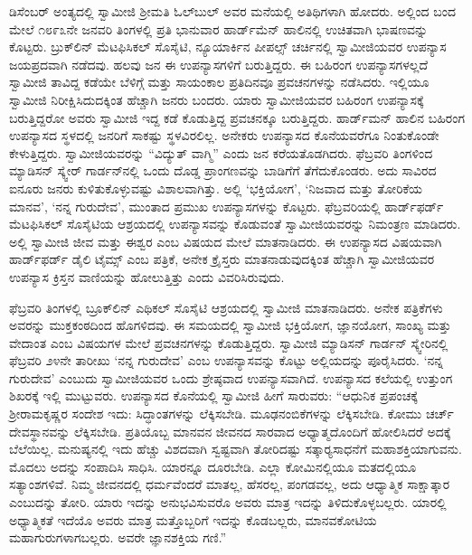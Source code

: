  ಡಿಸೆಂಬರ್ ಅಂತ್ಯದಲ್ಲಿ ಸ್ವಾಮೀಜಿ ಶ‍್ರೀಮತಿ ಓಲ್‍ಬುಲ್ ಅವರ ಮನೆಯಲ್ಲಿ ಅತಿಥಿಗಳಾಗಿ ಹೋದರು. ಅಲ್ಲಿಂದ ಬಂದ ಮೇಲೆ ೧೮೯೩ನೇ ಜನವರಿ ತಿಂಗಳಲ್ಲಿ ಪ್ರತಿ ಭಾನುವಾರ ಹಾರ್ಡ್‍ಮೆನ್ ಹಾಲಿನಲ್ಲಿ ಉಚಿತವಾಗಿ ಭಾಷಣವನ್ನು ಕೊಟ್ಟರು. ಬ್ರುಕ್‍ಲಿನ್ ಮೆಟಫಿಸಿಕಲ್ ಸೊಸೈಟಿ, ನ್ಯೂಯಾರ್ಕಿನ ಪೀಪಲ್ಸ್ ಚರ್ಚಿನಲ್ಲಿ ಸ್ವಾಮೀಜಿಯವರ ಉಪನ್ಯಾಸ ಜಯಪ್ರದವಾಗಿ ನಡೆದವು. ಹಲವು ಜನ ಈ ಉಪನ್ಯಾಸಗಳಿಗೆ ಬರುತ್ತಿದ್ದರು. ಈ ಬಹಿರಂಗ ಉಪನ್ಯಾಸಗಳಲ್ಲದೆ ಸ್ವಾಮೀಜಿ ತಾವಿದ್ದ ಕಡೆಯೇ ಬೆಳಿಗ್ಗೆ ಮತ್ತು ಸಾಯಂಕಾಲ ಪ್ರತಿದಿನವೂ ಪ್ರವಚನಗಳನ್ನು ನಡೆಸಿದರು. ಇಲ್ಲಿಯೂ ಸ್ವಾಮೀಜಿ ನಿರೀಕ್ಷಿಸಿದುದಕ್ಕಿಂತ ಹೆಚ್ಚಾಗಿ ಜನರು ಬಂದರು. ಯಾರು ಸ್ವಾಮೀಜಿಯವರ ಬಹಿರಂಗ ಉಪನ್ಯಾಸಕ್ಕೆ ಬರುತ್ತಿದ್ದರೋ ಅವರು ಸ್ವಾಮೀಜಿ ಇದ್ದ ಕಡೆ ಕೊಡುತ್ತಿದ್ದ ಪ್ರವಚನಕ್ಕೂ ಬರುತ್ತಿದ್ದರು. ಹಾರ್ಡ್‍ಮನ್ ಹಾಲಿನ ಬಹಿರಂಗ ಉಪನ್ಯಾಸದ ಸ್ಥಳದಲ್ಲಿ ಜನರಿಗೆ ಸಾಕಷ್ಟು ಸ್ಥಳವಿರಲಿಲ್ಲ. ಅನೇಕರು ಉಪನ್ಯಾಸದ ಕೊನೆಯವರೆಗೂ ನಿಂತುಕೊಂಡೇ ಕೇಳುತ್ತಿದ್ದರು. ಸ್ವಾಮೀಜಿಯವರನ್ನು “ವಿದ್ಯುತ್ ವಾಗ್ಮಿ” ಎಂದು ಜನ ಕರೆಯತೊಡಗಿದರು. ಫೆಬ್ರವರಿ ತಿಂಗಳಿಂದ ಮ್ಯಾಡಿಸನ್ ಸ್ಕ್ವೇರ್ ಗಾರ್ಡನ್‍ನಲ್ಲಿ ಒಂದು ದೊಡ್ಡ ಪ್ರಾಂಗಣವನ್ನು ಬಾಡಿಗೆಗೆ ತೆಗೆದುಕೊಂಡರು. ಅದು ಸಾವಿರದ ಐನೂರು ಜನರು ಕುಳಿತುಕೊಳ್ಳುವಷ್ಟು ವಿಶಾಲವಾಗಿತ್ತು. ಅಲ್ಲಿ ‘ಭಕ್ತಿಯೋಗ’, ‘ನಿಜವಾದ ಮತ್ತು ತೋರಿಕೆಯ ಮಾನವ’, ‘ನನ್ನ ಗುರುದೇವ’, ಮುಂತಾದ ಪ್ರಮುಖ ಉಪನ್ಯಾಸಗಳನ್ನು ಕೊಟ್ಟರು. ಫೆಬ್ರವರಿಯಲ್ಲಿ ಹಾರ್ಡ್‍ಫರ್ಡ್ ಮೆಟಫಿಸಿಕಲ್ ಸೊಸೈಟಿಯ ಆಶ್ರಯದಲ್ಲಿ ಉಪನ್ಯಾಸವನ್ನು ಕೊಡುವಂತೆ ಸ್ವಾಮೀಜಿಯವರನ್ನು ನಿಮಂತ್ರಣ ಮಾಡಿದರು. ಅಲ್ಲಿ ಸ್ವಾಮೀಜಿ ಜೀವ ಮತ್ತು ಈಶ್ವರ ಎಂಬ ವಿಷಯದ ಮೇಲೆ ಮಾತನಾಡಿದರು. ಈ ಉಪನ್ಯಾಸದ ವಿಷಯವಾಗಿ ಹಾರ್ಡ್‍ಫರ್ಡ್ ಡೈಲಿ ಟೈಮ್ಸ್ ಎಂಬ ಪತ್ರಿಕೆ, ಅನೇಕ ಕ್ರೈಸ್ತರು ಮಾತನಾಡುವುದಕ್ಕಿಂತ ಹೆಚ್ಚಾಗಿ ಸ್ವಾಮೀಜಿಯವರ ಉಪನ್ಯಾಸ ಕ್ರಿಸ್ತನ ವಾಣಿಯನ್ನು ಹೋಲುತ್ತಿತ್ತು ಎಂದು ವಿವರಿಸಿರುವುದು. 

 ಫೆಬ್ರವರಿ ತಿಂಗಳಲ್ಲಿ ಬ್ರೂಕ್‍ಲಿನ್ ಎಥಿಕಲ್ ಸೊಸೈಟಿ ಆಶ್ರಯದಲ್ಲಿ ಸ್ವಾಮೀಜಿ ಮಾತನಾಡಿದರು. ಅನೇಕ ಪತ್ರಿಕೆಗಳು ಅವರನ್ನು ಮುಕ್ತಕಂಠದಿಂದ ಹೊಗಳಿದವು. ಈ ಸಮಯದಲ್ಲಿ ಸ್ವಾಮೀಜಿ ಭಕ್ತಿಯೋಗ, ಜ್ಞಾನಯೋಗ, ಸಾಂಖ್ಯ ಮತ್ತು ವೇದಾಂತ ಎಂಬ ವಿಷಯಗಳ ಮೇಲೆ ಪ್ರವಚನಗಳನ್ನು ಕೊಡುತ್ತಿದ್ದರು. ಸ್ವಾಮೀಜಿ ಮ್ಯಾಡಿಸನ್ ಗಾರ್ಡನ್ ಸ್ಕ್ವೇರಿನಲ್ಲಿ ಫೆಬ್ರವರಿ ೨೪ನೇ ತಾರೀಖು ‘ನನ್ನ ಗುರುದೇವ’ ಎಂಬ ಉಪನ್ಯಾಸವನ್ನು ಕೊಟ್ಟು ಅಲ್ಲಿಯದನ್ನು ಪೂರೈಸಿದರು. ‘ನನ್ನ ಗುರುದೇವ’ ಎಂಬುದು ಸ್ವಾಮೀಜಿಯವರ ಒಂದು ಶ್ರೇಷ್ಠವಾದ ಉಪನ್ಯಾಸವಾಗಿದೆ. ಉಪನ್ಯಾಸದ ಕಲೆಯಲ್ಲಿ ಉತ್ತುಂಗ ಶಿಖರಕ್ಕೆ ಇಲ್ಲಿ ಮುಟ್ಟುವರು. ಉಪನ್ಯಾಸದ ಕೊನೆಯಲ್ಲಿ ಸ್ವಾಮೀಜಿ ಹೀಗೆ ಸಾರುವರು: “ಆಧುನಿಕ ಪ್ರಪಂಚಕ್ಕೆ ಶ‍್ರೀರಾಮಕೃಷ್ಣರ ಸಂದೇಶ ಇದು: ಸಿದ್ಧಾಂತಗಳನ್ನು ಲೆಕ್ಕಿಸಬೇಡಿ. ಮೂಢನಂಬಿಕೆಗಳನ್ನು ಲೆಕ್ಕಿಸಬೇಡಿ. ಕೋಮು ಚರ್ಚ್ ದೇವಸ್ಥಾನವನ್ನು ಲೆಕ್ಕಿಸಬೇಡಿ. ಪ್ರತಿಯೊಬ್ಬ ಮಾನವನ ಜೀವನದ ಸಾರವಾದ ಅಧ್ಯಾತ್ಮದೊಂದಿಗೆ ಹೋಲಿಸಿದರೆ ಅದಕ್ಕೆ ಬೆಲೆಯಿಲ್ಲ. ಮನುಷ್ಯನಲ್ಲಿ ಇದು ಹೆಚ್ಚು ವಿಶದವಾಗಿ ಸ್ವಷ್ಟವಾಗಿ ತೋರಿದಷ್ಟು ಸತ್ಕಾರ‍್ಯಸಾಧನೆಗೆ ಮಹಾಶಕ್ತಿಯಾಗುವನು. ಮೊದಲು ಅದನ್ನು ಸಂಪಾದಿಸಿ ಸಾಧಿಸಿ. ಯಾರನ್ನೂ ದೂರಬೇಡಿ. ಎಲ್ಲಾ ಕೋಮಿನಲ್ಲಿಯೂ ಮತದಲ್ಲಿಯೂ ಸತ್ಯಾಂಶಗಳಿವೆ. ನಿಮ್ಮ ಜೀವನದಲ್ಲಿ ಧರ್ಮವೆಂದರೆ ಮಾತಲ್ಲ, ಹೆಸರಲ್ಲ, ಪಂಗಡವಲ್ಲ, ಅದು ಆಧ್ಯಾತ್ಮಿಕ ಸಾಕ್ಷಾತ್ಕಾರ ಎಂಬುದನ್ನು ತೋರಿ. ಯಾರು ಇದನ್ನು ಅನುಭವಿಸುವರೊ ಅವರು ಮಾತ್ರ ಇದನ್ನು ತಿಳಿದುಕೊಳ್ಳಬಲ್ಲರು. ಯಾರಲ್ಲಿ ಅಧ್ಯಾತ್ಮಿಕತೆ ಇದೆಯೊ ಅವರು ಮಾತ್ರ ಮತ್ತೊಬ್ಬರಿಗೆ ಇದನ್ನು ಕೊಡಬಲ್ಲರು, ಮಾನವಕೋಟಿಯ ಮಹಾಗುರುಗಳಾಗಬಲ್ಲರು. ಅವರೇ ಜ್ಞಾನಶಕ್ತಿಯ ಗಣಿ.” 

